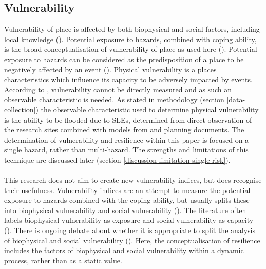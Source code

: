 \subsection{Vulnerability}
Vulnerability of place is affected by both biophysical and social factors, including local knowledge (\cite{opach_seeking_2020}). Potential exposure to hazards, combined with coping ability, is the broad conceptualisation of vulnerability of place as used here (\cite{rygel_method_2006}). Potential exposure to hazards can be considered as the predisposition of a place to be negatively affected by an event (\cite{lujala_quantifying_2014}). Physical vulnerability is a places characteristics which influence its capacity to be adversely impacted by events. According to \cite{rod_integrated_2012}, vulnerability cannot be directly measured and as such an observable characteristic is needed.  As stated in methodology (section \ref{data-collection}) the observable characteristic used to determine physical vulnerability is the ability to be flooded due to SLEs, determined from direct observation of the research sites combined with models from \cite{kartverket_se_2020} and planning documents. The determination of vulnerability and resilience within this paper is focused on a single hazard, rather than multi-hazard. The strengths and limitations of this technique are discussed later (section \ref{discussion-limitation-single-risk}). 
\paragraph{}
This research does not aim to create new vulnerability indices, but does recognise their usefulness. Vulnerability indices are an attempt to measure the potential exposure to hazards combined with the coping ability, but usually splits these into biophysical vulnerability  and social vulnerability (\cite{rod_integrated_2012}). The literature often labels biophysical vulnerability as exposure and social vulnerability as capacity (\cite{rod_integrated_2012}). There is ongoing debate about whether it is appropriate to split the analysis of biophysical and social vulnerability (\cite{lujala_quantifying_2014}). Here, the conceptualisation of resilience includes the factors of biophysical and social vulnerability within a dynamic process, rather than as a static value.

